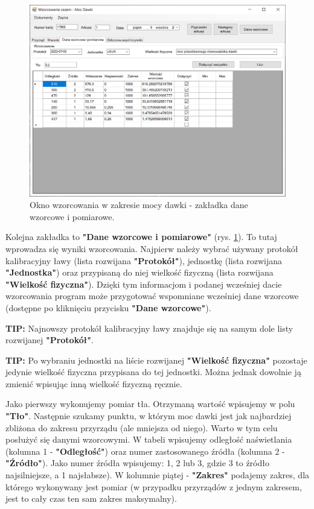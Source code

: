 \begin{figure}[htb]
	\centering
	\includegraphics[width=\columnwidth]{obrazki/Wzorcowanie/moc_dawki/dane.png}
	\caption{Okno wzorcowania w zakresie mocy dawki - zakładka dane wzorcowe i pomiarowe.}
	\label{mocDane}
\end{figure}

Kolejna zakładka to \textbf{"Dane wzorcowe i pomiarowe"} (rys. \ref{mocDane}). To tutaj wprowadza się wyniki wzorcowania. Najpierw należy wybrać używany protokół kalibracyjny ławy (lista rozwijana \textbf{"Protokół"}), jednostkę (lista rozwijana \textbf{"Jednostka"}) oraz przypisaną do niej wielkość fizyczną (lista rozwijana \textbf{"Wielkość fizyczna"}). Dzięki tym informacjom i podanej wcześniej dacie wzorcowania program może przygotować wspomniane wcześniej dane wzorcowe (dostępne po kliknięciu przycisku \textbf{"Dane wzorcowe"}).

\textbf{TIP:} Najnowszy protokół kalibracyjny ławy znajduje się na samym dole listy rozwijanej \textbf{"Protokół"}.

\textbf{TIP:} Po wybraniu jednostki na liście rozwijanej \textbf{"Wielkość fizyczna"} pozostaje jedynie wielkość fizyczna przypisana do tej jednostki. Można jednak dowolnie ją zmienić wpisując inną wielkość fizyczną ręcznie.

Jako pierwszy wykonujemy pomiar tła. Otrzymaną wartość wpisujemy w polu \textbf{"Tło"}. Następnie szukamy punktu, w którym moc dawki jest jak najbardziej zbliżona do zakresu przyrządu (ale mniejsza od niego). Warto w tym celu posłużyć się danymi wzorcowymi. W tabeli wpisujemy odległość naświetlania (kolumna 1 - \textbf{"Odległość"}) oraz numer zastosowanego źródła (kolumna 2 - \textbf{"Źródło"}). Jako numer źródła wpisujemy: 1, 2 lub 3, gdzie 3 to źródło najsilniejsze, a 1 najsłabsze). W kolumnie piątej - \textbf{"Zakres"} podajemy zakres, dla którego wykonywany jest pomiar (w przypadku przyrządów z jednym zakresem, jest to cały czas ten sam zakres maksymalny).

